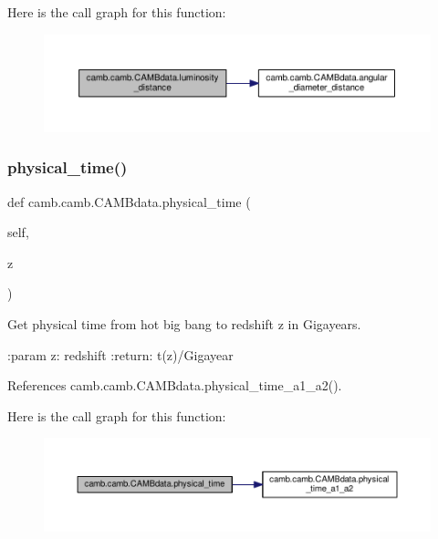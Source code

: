 Here is the call graph for this function\+:
\nopagebreak
\begin{figure}[H]
\begin{center}
\leavevmode
\includegraphics[width=350pt]{classcamb_1_1camb_1_1CAMBdata_abae42ef628ce5258f1b8ce60ccc91846_cgraph}
\end{center}
\end{figure}
\mbox{\label{classcamb_1_1camb_1_1CAMBdata_a220cd9761a72b0038e0928aa01617fe5}} 
\subsubsection{\texorpdfstring{physical\+\_\+time()}{physical\_time()}}
{\footnotesize\ttfamily def camb.\+camb.\+C\+A\+M\+Bdata.\+physical\+\_\+time (\begin{DoxyParamCaption}\item[{}]{self,  }\item[{}]{z }\end{DoxyParamCaption})}

\begin{DoxyVerb}Get physical time from hot big bang to redshift z in Gigayears.

:param z:  redshift
:return: t(z)/Gigayear
\end{DoxyVerb}
 

References camb.\+camb.\+C\+A\+M\+Bdata.\+physical\+\_\+time\+\_\+a1\+\_\+a2().

Here is the call graph for this function\+:
\nopagebreak
\begin{figure}[H]
\begin{center}
\leavevmode
\includegraphics[width=350pt]{classcamb_1_1camb_1_1CAMBdata_a220cd9761a72b0038e0928aa01617fe5_cgraph}
\end{center}
\end{figure}
\mbox{\label{classcamb_1_1camb_1_1CAMBdata_a4dd9bc539d831789e3fbad5bb882111e}} 
